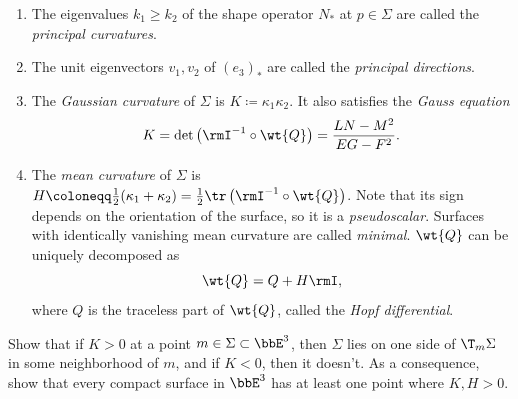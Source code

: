 \begin{defn}
    \begin{enumerate}
        \item The eigenvalues $k_1\geq k_2$ of the shape operator $N_\ast$ at $p\in \Sigma$ are called the \emph{principal curvatures}.
        \item The unit eigenvectors $v_1,v_2$ of $(e_3)_\ast$ are called the \emph{principal directions}.
        \item The \emph{Gaussian curvature} of $\Sigma$ is $K\coloneqq \kappa_1\kappa_2$. It also satisfies the \emph{Gauss equation}
        \[K=\det\left(\rmI^{-1}\circ \wt{Q}\right)=\frac{LN-M^2}{EG-F^2}.\]
        \item The \emph{mean curvature} of $\Sigma$ is $H\coloneqq \frac12(\kappa_1+\kappa_2)=\frac12\tr\left(\rmI^{-1}\circ \wt{Q}\right)$. Note that its sign depends on the orientation of the surface, so it is a \emph{pseudoscalar}. Surfaces with identically vanishing mean curvature are called \emph{minimal}. $\wt{Q}$ can be uniquely decomposed as
        \[\wt{Q}=Q+H\rmI,\]
        where $Q$ is the traceless part of $\wt{Q}$, called the \emph{Hopf differential}.
    \end{enumerate}
\end{defn}

\begin{xca}
    Show that if $K>0$ at a point $m\in \Sigma\subset \bbE^3$, then $\Sigma$ lies on one side of $\T_m\Sigma$ in some neighborhood of $m$, and if $K<0$, then it doesn't. As a consequence, show that every compact surface in $\bbE^3$ has at least one point where $K,H>0$.
\end{xca}

